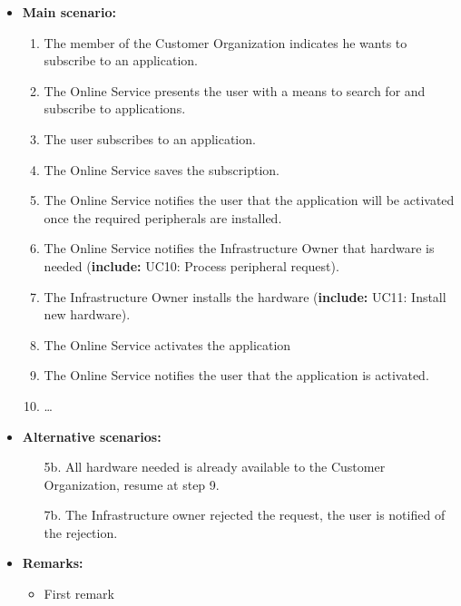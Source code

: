\documentclass[english,peerreview]{sareport}
\begin{document}
\begin{itemize}
    \item \textbf{Main scenario:} 
    \begin{enumerate}
       \item The member of the Customer Organization indicates he wants to subscribe to an application.
       \item The Online Service presents the user with a means to search for and subscribe to applications.
       \item The user subscribes to an application.
	\item The Online Service saves the subscription.
	\item The Online Service notifies the user that the application will be activated once the required peripherals are installed.
	\item The Online Service notifies the Infrastructure Owner that hardware is needed (\textbf{include:} UC10: Process peripheral request).
	\item The Infrastructure Owner installs the hardware (\textbf{include:} UC11: Install new hardware).
	\item The Online Service activates the application
	\item The Online Service notifies the user that the application is activated.
       \item \ldots
    \end{enumerate}

    \item \textbf{Alternative scenarios:} 
    \begin{enumerate}
	\item [5b.] All hardware needed is already available to the Customer Organization, resume at step 9.
        \item [7b.] The Infrastructure owner rejected the request, the user is notified of the rejection.
    \end{enumerate}
    
    \item \textbf{Remarks:}
        \begin{itemize}
            \item First remark
        \end{itemize}
\end{itemize}
\end{document}
